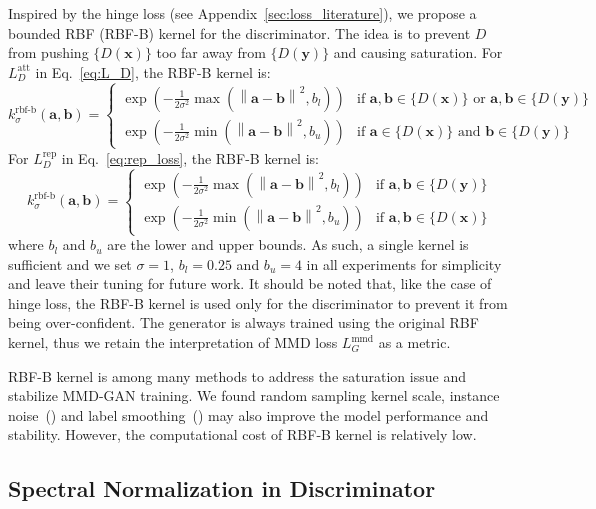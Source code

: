 \documentclass{article} %
\theoremstyle{plain}
\newtheorem*{proposition 1*}{Proposition 1}
\newcommand\norm[1]{\left\lVert#1\right\rVert}
\begin{document}
Inspired by the hinge loss (see Appendix~\ref{sec:loss_literature}), we propose a bounded RBF (RBF-B) kernel for the discriminator. The idea is to prevent \(D\) from pushing \(\{D(\bm{x})\}\) too far away from \(\{D(\bm{y})\}\) and causing saturation. For \(L_D^{\text{att}}\) in Eq.~\ref{eq:L_D}, the RBF-B kernel is:
\begin{equation}\label{eq:rbf_b1}
k_{\sigma}^{\text{rbf-b}}(\bm{a},\bm{b}) =
\begin{cases}
\exp(-\frac{1}{2\sigma^2}\max(\norm{\bm{a}-\bm{b}}^2, b_l)) & \text{if $\bm{a},\bm{b}\in\{D(\bm{x})\}$ or $\bm{a},\bm{b}\in\{D(\bm{y})\}$} \\
\exp(-\frac{1}{2\sigma^2}\min(\norm{\bm{a}-\bm{b}}^2, b_u)) & \text{if $\bm{a}\in\{D(\bm{x})\}$ and $\bm{b}\in\{D(\bm{y})\}$}
\end{cases}
\end{equation}
For \(L_{D}^{\text{rep}}\) in Eq.~\ref{eq:rep_loss}, the RBF-B kernel is:
\begin{equation}\label{eq:rbf_b2}
k_{\sigma}^{\text{rbf-b}}(\bm{a},\bm{b}) =
\begin{cases}
\exp(-\frac{1}{2\sigma^2}\max(\norm{\bm{a}-\bm{b}}^2, b_l)) & \text{if $\bm{a},\bm{b}\in\{D(\bm{y})\}$} \\
\exp(-\frac{1}{2\sigma^2}\min(\norm{\bm{a}-\bm{b}}^2, b_u)) & \text{if $\bm{a},\bm{b}\in\{D(\bm{x})\}$}
\end{cases}
\end{equation}
where \(b_l\) and \(b_u\) are the lower and upper bounds. As such, a single kernel is sufficient and we set \(\sigma=1\), \(b_l=0.25\) and \(b_u=4\) in all experiments for simplicity and leave their tuning for future work. It should be noted that, like the case of hinge loss, the RBF-B kernel is used only for the discriminator to prevent it from being over-confident. The generator is always trained using the original RBF kernel, thus we retain the interpretation of MMD loss \(L_{G}^{\text{mmd}}\) as a metric.

RBF-B kernel is among many methods to address the saturation issue and stabilize MMD-GAN training. We found random sampling kernel scale, instance noise~(\cite{instance_noise}) and label smoothing~(\cite{label_smooth1,label_smooth2}) may also improve the model performance and stability. However, the computational cost of RBF-B kernel is relatively low. 

\subsection{Spectral Normalization in Discriminator}
\label{sec:sn}
\end{document}
